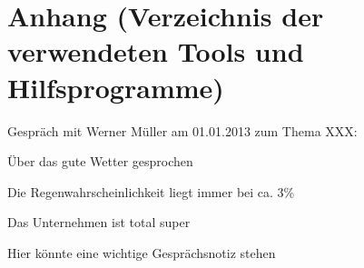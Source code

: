 \section*{Anhang (Verzeichnis der verwendeten Tools und Hilfsprogramme)}

\anhangsverzeichnis



Gespräch mit Werner Müller am 01.01.2013 zum Thema XXX:
\begin{compactitem}
	\item Über das gute Wetter gesprochen
	\item Die Regenwahrscheinlichkeit liegt immer bei ca. 3\%
	\item Das Unternehmen ist total super
	\item Hier könnte eine wichtige Gesprächsnotiz stehen
\end{compactitem}